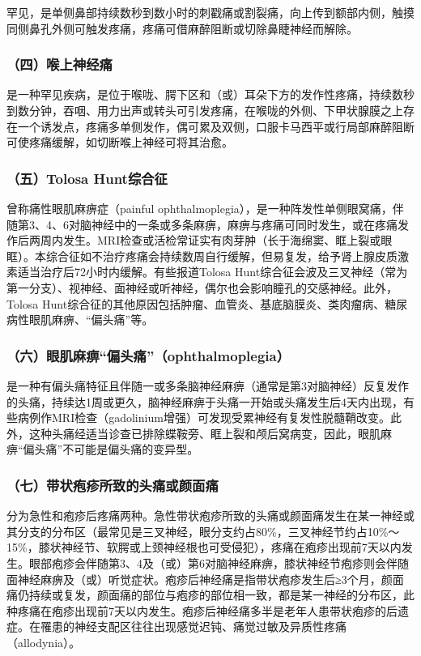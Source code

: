 罕见，是单侧鼻部持续数秒到数小时的刺戳痛或割裂痛，向上传到额部内侧，触摸同侧鼻孔外侧可触发疼痛，疼痛可借麻醉阻断或切除鼻睫神经而解除。

\subsubsection{（四）喉上神经痛}

是一种罕见疾病，是位于喉咙、腭下区和（或）耳朵下方的发作性疼痛，持续数秒到数分钟，吞咽、用力出声或转头可引发疼痛，在喉咙的外侧、下甲状腺膜之上存在一个诱发点，疼痛多单侧发作，偶可累及双侧，口服卡马西平或行局部麻醉阻断可使疼痛缓解，如切断喉上神经可将其治愈。

\subsubsection{（五）Tolosa Hunt综合征}

曾称痛性眼肌麻痹症（painful
ophthalmoplegia），是一种阵发性单侧眼窝痛，伴随第3、4、6对脑神经中的一条或多条麻痹，麻痹与疼痛可同时发生，或在疼痛发作后两周内发生。MRI检查或活检常证实有肉芽肿（长于海绵窦、眶上裂或眼眶）。本综合征如不治疗疼痛会持续数周自行缓解，但易复发，给予肾上腺皮质激素适当治疗后72小时内缓解。有些报道Tolosa
Hunt综合征会波及三叉神经（常为第一分支）、视神经、面神经或听神经，偶尔也会影响瞳孔的交感神经。此外，Tolosa
Hunt综合征的其他原因包括肿瘤、血管炎、基底脑膜炎、类肉瘤病、糖尿病性眼肌麻痹、“偏头痛”等。

\subsubsection{（六）眼肌麻痹“偏头痛”（ophthalmoplegia）}

是一种有偏头痛特征且伴随一或多条脑神经麻痹（通常是第3对脑神经）反复发作的头痛，持续达1周或更久，脑神经麻痹于头痛一开始或头痛发生后4天内出现，有些病例作MRI检查（gadolinium增强）可发现受累神经有复发性脱髓鞘改变。此外，这种头痛经适当诊查已排除蝶鞍旁、眶上裂和颅后窝病变，因此，眼肌麻痹“偏头痛”不可能是偏头痛的变异型。

\subsubsection{（七）带状疱疹所致的头痛或颜面痛}

分为急性和疱疹后疼痛两种。急性带状疱疹所致的头痛或颜面痛发生在某一神经或其分支的分布区（最常见是三叉神经，眼分支约占80\%，三叉神经节约占10\%～15\%，膝状神经节、软腭或上颈神经根也可受侵犯），疼痛在疱疹出现前7天以内发生。眼部疱疹会伴随第3、4及（或）第6对脑神经麻痹，膝状神经节疱疹则会伴随面神经麻痹及（或）听觉症状。疱疹后神经痛是指带状疱疹发生后≥3个月，颜面痛仍持续或复发，颜面痛的部位与疱疹的部位相一致，都是某一神经的分布区，此种疼痛在疱疹出现前7天以内发生。疱疹后神经痛多半是老年人患带状疱疹的后遗症。在罹患的神经支配区往往出现感觉迟钝、痛觉过敏及异质性疼痛（allodynia）。

